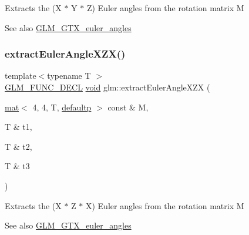 Extracts the (X $\ast$ Y $\ast$ Z) Euler angles from the rotation matrix M \begin{DoxySeeAlso}{See also}
\mbox{\hyperlink{group__gtx__euler__angles}{G\+L\+M\+\_\+\+G\+T\+X\+\_\+euler\+\_\+angles}} 
\end{DoxySeeAlso}
\mbox{\label{group__gtx__euler__angles_gacf0bc6c031f25fa3ee0055b62c8260d0}} 
\subsubsection{\texorpdfstring{extract\+Euler\+Angle\+X\+Z\+X()}{extractEulerAngleXZX()}}
{\footnotesize\ttfamily template$<$typename T $>$ \\
\mbox{\hyperlink{setup_8hpp_ab2d052de21a70539923e9bcbf6e83a51}{G\+L\+M\+\_\+\+F\+U\+N\+C\+\_\+\+D\+E\+CL}} \mbox{\hyperlink{_s_d_l__opengles2__gl2ext_8h_ae5d8fa23ad07c48bb609509eae494c95}{void}} glm\+::extract\+Euler\+Angle\+X\+ZX (\begin{DoxyParamCaption}\item[{\mbox{\hyperlink{structglm_1_1mat}{mat}}$<$ 4, 4, T, \mbox{\hyperlink{namespaceglm_a36ed105b07c7746804d7fdc7cc90ff25a9d21ccd8b5a009ec7eb7677befc3bf51}{defaultp}} $>$ const \&}]{M,  }\item[{T \&}]{t1,  }\item[{T \&}]{t2,  }\item[{T \&}]{t3 }\end{DoxyParamCaption})}

Extracts the (X $\ast$ Z $\ast$ X) Euler angles from the rotation matrix M \begin{DoxySeeAlso}{See also}
\mbox{\hyperlink{group__gtx__euler__angles}{G\+L\+M\+\_\+\+G\+T\+X\+\_\+euler\+\_\+angles}} 
\end{DoxySeeAlso}
\mbox{\label{group__gtx__euler__angles_gabe5a65d8eb1cd873c8de121cce1a15ed}} 
